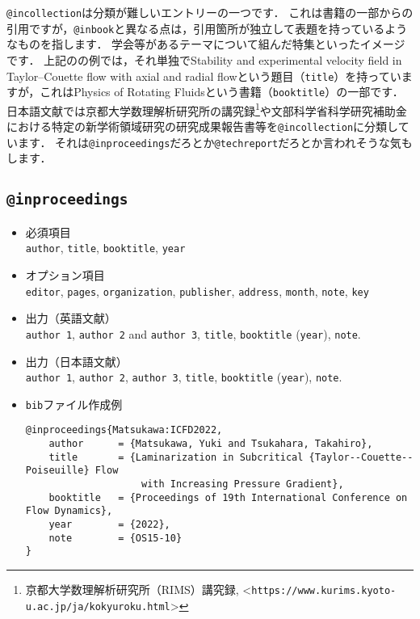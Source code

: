 \documentclass[a4paper,fleqn,uplatex,dvipdfmx]{jsarticle}
\makeatletter
\newcommand{\ttinbook}{\texttt{@inbook}}
\newcommand{\ttincollection}{\texttt{@incollection}}
\newcommand{\ttinproceedings}{\texttt{@inproceedings}}
\newcommand{\tttechreport}{\texttt{@techreport}}
\makeatother
\begin{document}
\ttincollection は分類が難しいエントリーの一つです．
これは書籍の一部からの引用ですが，\ttinbook と異なる点は，引用箇所が独立して表題を持っているようなものを指します．
学会等があるテーマについて組んだ特集といったイメージです．
上記の\citet{Lueptow:Springer2000}の例では，それ単独でStability and experimental velocity field in Taylor--Couette flow with axial and radial flowという題目（\verb|title|）を持っていますが，これはPhysics of Rotating Fluidsという書籍（\verb|booktitle|）の一部です．
日本語文献では京都大学数理解析研究所の講究録\footnote{京都大学数理解析研究所（RIMS）講究録, \textless\verb|https://www.kurims.kyoto-u.ac.jp/ja/kokyuroku.html|\textgreater}や文部科学省科学研究補助金における特定の新学術領域研究の研究成果報告書等を\ttincollection に分類しています．
それは\ttinproceedings だろとか\tttechreport だろとか言われそうな気もします．

\subsection{\ttinproceedings}
\label{ssec:inproceedings}
\begin{screen}
    \begin{itemize}
        \item 必須項目 \\
        \verb|author|, \verb|title|, \verb|booktitle|, \verb|year|
        \item オプション項目 \\
        \verb|editor|, \verb|pages|, \verb|organization|, \verb|publisher|, \verb|address|, \verb|month|, \verb|note|, \verb|key|
        \item 出力（英語文献） \\
            \colorbox[gray]{0.8}{\texttt{author 1}}, \colorbox[gray]{0.8}{\texttt{author 2}} and \colorbox[gray]{0.8}{\texttt{author 3}}, \colorbox[gray]{0.8}{\texttt{title}}, \colorbox[gray]{0.8}{\texttt{booktitle}} (\colorbox[gray]{0.8}{\texttt{year}}), \colorbox[gray]{0.8}{\texttt{note}}.
        \item 出力（日本語文献） \\
            \colorbox[gray]{0.8}{\texttt{author 1}}, \colorbox[gray]{0.8}{\texttt{author 2}}, \colorbox[gray]{0.8}{\texttt{author 3}}, \colorbox[gray]{0.8}{\texttt{title}}, \colorbox[gray]{0.8}{\texttt{booktitle}} (\colorbox[gray]{0.8}{\texttt{year}}), \colorbox[gray]{0.8}{\texttt{note}}.
        \item \verb|bib|ファイル作成例 \vspace{-3mm}
\begin{verbatim}
@inproceedings{Matsukawa:ICFD2022,
    author      = {Matsukawa, Yuki and Tsukahara, Takahiro},
    title       = {Laminarization in Subcritical {Taylor--Couette--Poiseuille} Flow 
                    with Increasing Pressure Gradient},
    booktitle   = {Proceedings of 19th International Conference on Flow Dynamics},
    year        = {2022},
    note        = {OS15-10}
}
\end{verbatim}
    \end{itemize}
\end{screen}
\end{document}
